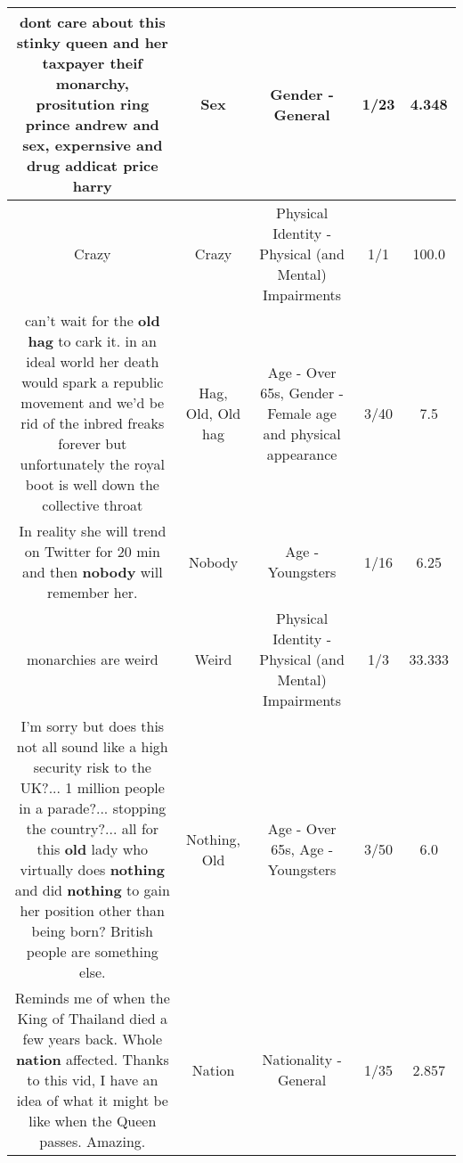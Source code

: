 \documentclass[11pt]{article}
\newlength\mylength
\begin{document}
\begin{center}
\begin{longtable}{|C{.65\mylength}|C{.30\mylength}|C{.12\mylength}|C{.12\mylength}|C{.12\mylength}|}
  \small dont care about this stinky queen and her taxpayer theif monarchy, prositution ring prince andrew and \textbf{sex}, expernsive and drug addicat price harry\normalsize   & Sex & Gender - General & 1/23 & 4.348 \\  \hline
  \small Crazy\normalsize   & Crazy & Physical Identity - Physical (and Mental) Impairments & 1/1 & 100.0 \\  \hline
  \small can't wait for the \textbf{o\textbf{ld} h\textbf{ag}} to cark it. in an ideal world her death would spark a republic movement and we'd be rid of the inbred freaks forever but unfortunately the royal boot is well down the collective throat\normalsize   & Hag, Old, Old hag & Age - Over 65s, Gender - Female age and physical appearance & 3/40 & 7.5 \\  \hline
  \small In reality she will trend on Twitter for 20 min and then \textbf{nobody} will remember her.\normalsize   & Nobody & Age - Youngsters & 1/16 & 6.25 \\  \hline
  \small monarchies are weird\normalsize   & Weird & Physical Identity - Physical (and Mental) Impairments & 1/3 & 33.333 \\  \hline
  \small I'm sorry but does this not all sound like a high security risk to the UK?... 1 million people in a parade?... stopping the country?... all for this \textbf{old} lady who virtually does \textbf{nothing} and did \textbf{nothing} to gain her position other than being born? British people are something else.\normalsize   & Nothing, Old & Age - Over 65s, Age - Youngsters & 3/50 & 6.0 \\  \hline
  \small Reminds me of when the King of Thailand died a few years back. Whole \textbf{nation} affected. Thanks to this vid, I have an idea of what it might be like when the Queen passes. Amazing.\normalsize   & Nation & Nationality - General & 1/35 & 2.857 \\  \hline

\end{longtable}
\end{center}
\end{document}
